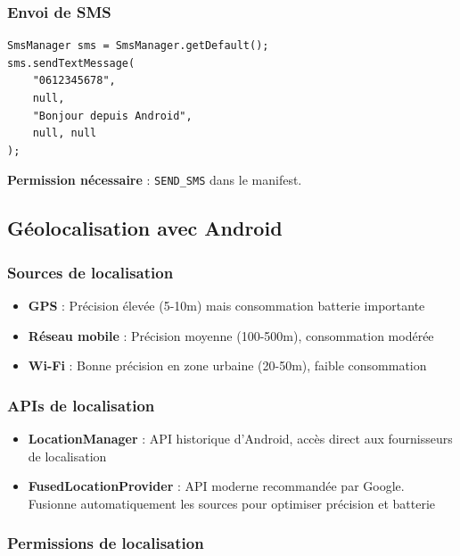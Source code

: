 \documentclass[11pt,a4paper]{article}
\begin{document}
\subsubsection{Envoi de SMS}

\begin{lstlisting}
SmsManager sms = SmsManager.getDefault();
sms.sendTextMessage(
    "0612345678",
    null,
    "Bonjour depuis Android",
    null, null
);
\end{lstlisting}

\textbf{Permission nécessaire} : \texttt{SEND\_SMS} dans le manifest.

\subsection{Géolocalisation avec Android}

\subsubsection{Sources de localisation}

\begin{itemize}
    \item \textbf{GPS} : Précision élevée (5-10m) mais consommation batterie importante
    \item \textbf{Réseau mobile} : Précision moyenne (100-500m), consommation modérée
    \item \textbf{Wi-Fi} : Bonne précision en zone urbaine (20-50m), faible consommation
\end{itemize}

\subsubsection{APIs de localisation}

\begin{itemize}
    \item \textbf{LocationManager} : API historique d'Android, accès direct aux fournisseurs de localisation
    \item \textbf{FusedLocationProvider} : API moderne recommandée par Google. Fusionne automatiquement les sources pour optimiser précision et batterie
\end{itemize}

\subsubsection{Permissions de localisation}
\end{document}
